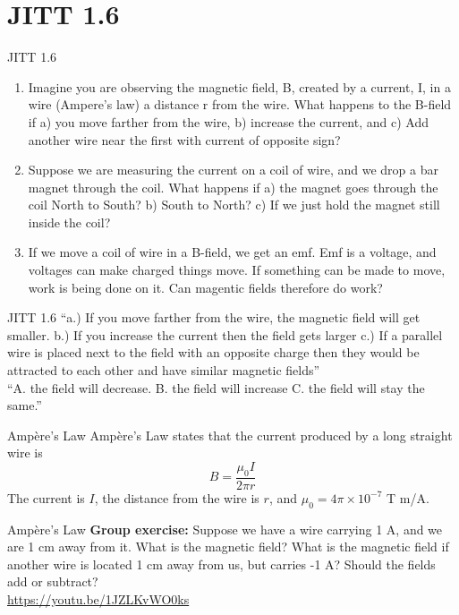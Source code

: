 \documentclass{beamer}
\begin{document}
\section{JITT 1.6}

\begin{frame}{JITT 1.6}
\small
\begin{enumerate}
\item  Imagine you are observing the magnetic field, B, created by a current, I, in a wire (Ampere's law) a distance r from the wire.  What happens to the B-field if a) you move farther from the wire, b) increase the current, and c) Add another wire near the first with current of opposite sign?
\item Suppose we are measuring the current on a coil of wire, and we drop a bar magnet through the coil.  What happens if a) the magnet goes through the coil North to South? b) South to North? c) If we just hold the magnet still inside the coil? 
\item If we move a coil of wire in a B-field, we get an emf.  Emf is a voltage, and voltages can make charged things move.  If something can be made to move, work is being done on it.  Can magentic fields therefore do work?
\end{enumerate}
\end{frame}

\begin{frame}{JITT 1.6}
``a.) If you move farther from the wire, the magnetic field will get smaller. b.) If you increase the current then the field gets larger c.) If a parallel wire is placed next to the field with an opposite charge then they would be attracted to each other and have similar magnetic fields'' \\
``A. the field will decrease. B. the field will increase C. the field will stay the same.'' \\
\end{frame}

\begin{frame}{Amp\`{e}re's Law}
Amp\`{e}re's Law states that the current produced by a long straight wire is
\begin{equation}
B = \frac{\mu_0 I}{2\pi r}
\end{equation}
The current is $I$, the distance from the wire is $r$, and $\mu_0 = 4\pi \times 10^{-7}$ T m/A.
\end{frame}

\begin{frame}{Amp\`{e}re's Law}
\textbf{Group exercise:} Suppose we have a wire carrying 1 A, and we are 1 cm away from it.  What is the magnetic field?  What is the magnetic field if another wire is located 1 cm away from us, but carries -1 A? Should the fields add or subtract? \\ \vspace{1cm}
\url{https://youtu.be/1JZLKvWO0ks}
\end{frame}
\end{document}
